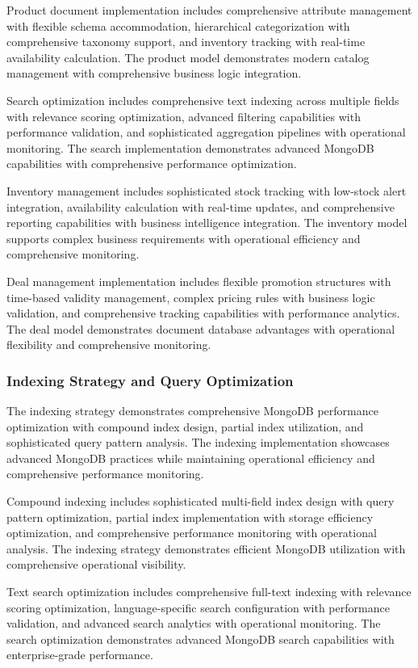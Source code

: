 Product document implementation includes comprehensive attribute management with flexible schema accommodation, hierarchical categorization with comprehensive taxonomy support, and inventory tracking with real-time availability calculation. The product model demonstrates modern catalog management with comprehensive business logic integration.

Search optimization includes comprehensive text indexing across multiple fields with relevance scoring optimization, advanced filtering capabilities with performance validation, and sophisticated aggregation pipelines with operational monitoring. The search implementation demonstrates advanced MongoDB capabilities with comprehensive performance optimization.

Inventory management includes sophisticated stock tracking with low-stock alert integration, availability calculation with real-time updates, and comprehensive reporting capabilities with business intelligence integration. The inventory model supports complex business requirements with operational efficiency and comprehensive monitoring.

Deal management implementation includes flexible promotion structures with time-based validity management, complex pricing rules with business logic validation, and comprehensive tracking capabilities with performance analytics. The deal model demonstrates document database advantages with operational flexibility and comprehensive monitoring.

\subsubsection{Indexing Strategy and Query Optimization}

The indexing strategy demonstrates comprehensive MongoDB performance optimization with compound index design, partial index utilization, and sophisticated query pattern analysis. The indexing implementation showcases advanced MongoDB practices while maintaining operational efficiency and comprehensive performance monitoring.

Compound indexing includes sophisticated multi-field index design with query pattern optimization, partial index implementation with storage efficiency optimization, and comprehensive performance monitoring with operational analysis. The indexing strategy demonstrates efficient MongoDB utilization with comprehensive operational visibility.

Text search optimization includes comprehensive full-text indexing with relevance scoring optimization, language-specific search configuration with performance validation, and advanced search analytics with operational monitoring. The search optimization demonstrates advanced MongoDB search capabilities with enterprise-grade performance.

